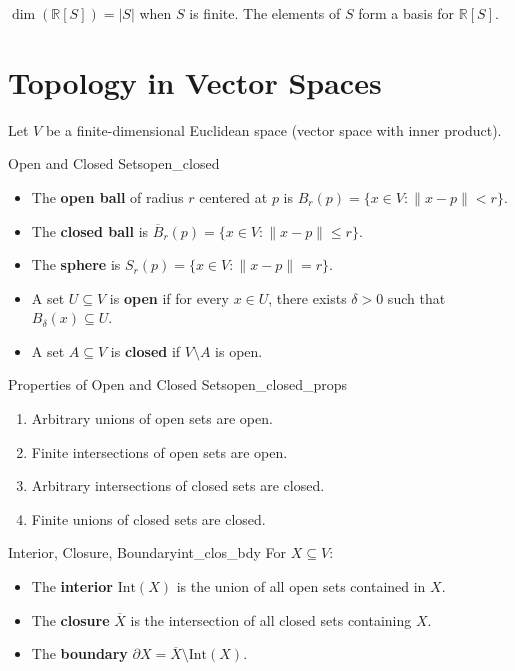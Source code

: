 \documentclass[11pt, letterpaper, openany]{book}
\begin{document}
\begin{remark}
$\dim(\mathbb{R}[S]) = |S|$ when $S$ is finite. The elements of $S$ form a basis for $\mathbb{R}[S]$.
\end{remark}

\section{Topology in Vector Spaces}

Let $V$ be a finite-dimensional Euclidean space (vector space with inner product).

\begin{defn}{Open and Closed Sets}{open_closed}
\begin{itemize}
    \item The \textbf{open ball} of radius $r$ centered at $p$ is $B_r(p) = \{x \in V : \|x - p\| < r\}$.
    \item The \textbf{closed ball} is $\overline{B}_r(p) = \{x \in V : \|x - p\| \leq r\}$.
    \item The \textbf{sphere} is $S_r(p) = \{x \in V : \|x - p\| = r\}$.
    \item A set $U \subseteq V$ is \textbf{open} if for every $x \in U$, there exists $\delta > 0$ such that $B_\delta(x) \subseteq U$.
    \item A set $A \subseteq V$ is \textbf{closed} if $V \setminus A$ is open.
\end{itemize}
\end{defn}

\begin{thm}{Properties of Open and Closed Sets}{open_closed_props}
\begin{enumerate}
    \item Arbitrary unions of open sets are open.
    \item Finite intersections of open sets are open.
    \item Arbitrary intersections of closed sets are closed.
    \item Finite unions of closed sets are closed.
\end{enumerate}
\end{thm}

\begin{defn}{Interior, Closure, Boundary}{int_clos_bdy}
For $X \subseteq V$:
\begin{itemize}
    \item The \textbf{interior} $\text{Int}(X)$ is the union of all open sets contained in $X$.
    \item The \textbf{closure} $\overline{X}$ is the intersection of all closed sets containing $X$.
    \item The \textbf{boundary} $\partial X = \overline{X} \setminus \text{Int}(X)$.
\end{itemize}
\end{defn}
\end{document}
